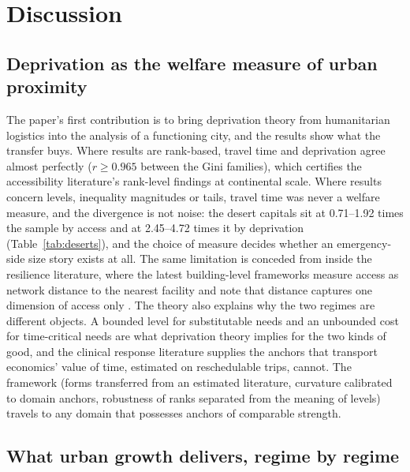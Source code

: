 \documentclass[11pt]{article}
\begin{document}
\section{Discussion}\label{sec:discussion}

\subsection{Deprivation as the welfare measure of urban proximity}\label{sec:theory-deprivation}

The paper's first contribution is to bring deprivation theory from
humanitarian logistics \citep{holguinveras2013objective,holguinveras2016econometric}
into the analysis of a functioning city, and the results show what the
transfer buys. Where results are rank-based, travel time and deprivation
agree almost perfectly ($r \geq 0.965$ between the Gini families), which
certifies the accessibility literature's rank-level findings
\citep{nicoletti2023disadvantaged,wu2025global} at continental scale.
Where results concern levels, inequality magnitudes or tails, travel time
was never a welfare measure, and the divergence is not noise: the desert
capitals sit at 0.71--1.92 times the sample by access and at 2.45--4.72
times it by deprivation (Table~\ref{tab:deserts}), and the choice of
measure decides whether an emergency-side size story exists at all. The
same limitation is conceded from inside the resilience literature, where
the latest building-level frameworks measure access as network distance
to the nearest facility and note that distance captures one dimension of
access only \citep{pagancajigas2026acces}. The
theory also explains why the two regimes are different objects. A bounded
level for substitutable needs and an unbounded cost for time-critical
needs are what deprivation theory implies for the two kinds of good, and
the clinical response literature \citep{larsen1993survival,nicholl2007distance}
supplies the anchors that transport economics' value of time, estimated on
reschedulable trips, cannot. The framework (forms transferred from an
estimated literature, curvature calibrated to domain anchors, robustness
of ranks separated from the meaning of levels) travels to any domain that
possesses anchors of comparable strength.

\subsection{What urban growth delivers, regime by regime}\label{sec:theory-scaling}
\end{document}
